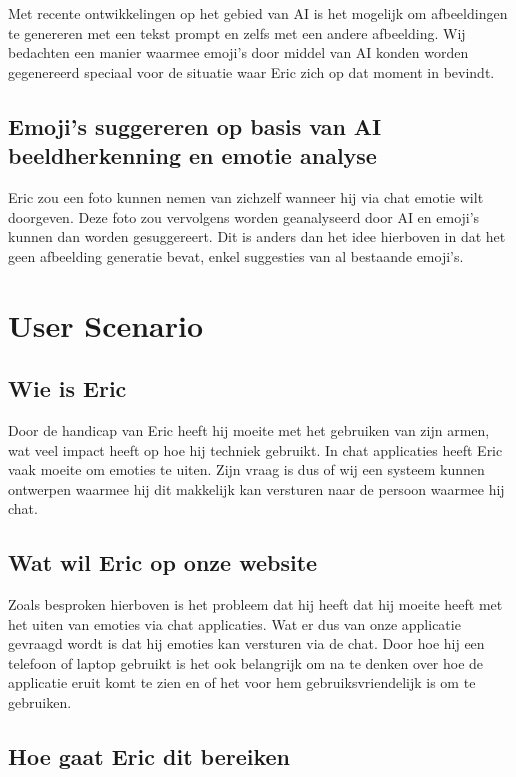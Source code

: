 \documentclass[12pt]{article}
\begin{document}
Met recente ontwikkelingen op het gebied van AI is het mogelijk om afbeeldingen te genereren met een tekst prompt en zelfs met een andere afbeelding.
Wij bedachten een manier waarmee emoji's door middel van AI konden worden gegenereerd speciaal voor de situatie waar Eric zich op dat moment in bevindt.

\subsection{Emoji's suggereren op basis van AI beeldherkenning en emotie analyse}

Eric zou een foto kunnen nemen van zichzelf wanneer hij via chat emotie wilt doorgeven.
Deze foto zou vervolgens worden geanalyseerd door AI en emoji's kunnen dan worden gesuggereert.
Dit is anders dan het idee hierboven in dat het geen afbeelding generatie bevat, enkel suggesties van al bestaande emoji's.

\section{User Scenario}

\subsection{Wie is Eric}

Door de handicap van Eric heeft hij moeite met het gebruiken van zijn armen, wat veel impact heeft op hoe hij techniek gebruikt.
In chat applicaties heeft Eric vaak moeite om emoties te uiten.
Zijn vraag is dus of wij een systeem kunnen ontwerpen waarmee hij dit makkelijk kan versturen naar de persoon waarmee hij chat.

\subsection{Wat wil Eric op onze website}

Zoals besproken hierboven is het probleem dat hij heeft dat hij moeite heeft met het uiten van emoties via chat applicaties.
Wat er dus van onze applicatie gevraagd wordt is dat hij emoties kan versturen via de chat.
Door hoe hij een telefoon of laptop gebruikt is het ook belangrijk om na te denken over hoe de applicatie eruit komt te zien en of het voor hem gebruiksvriendelijk is om te gebruiken.

\subsection{Hoe gaat Eric dit bereiken}
\end{document}
